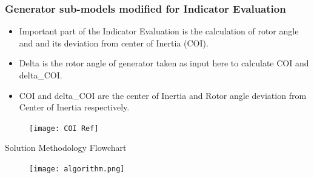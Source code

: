 \documentclass [xcolor=svgnames, t] {beamer}
\begin{document}
	\begin{frame}
	\frametitle{Generator sub-models modified for Indicator Evaluation}
	\begin{itemize} \justifying 
	\item Important part of the Indicator Evaluation is the calculation of rotor angle and and its deviation from center of Inertia (COI).
\item Delta is the rotor angle of generator taken as input here to calculate COI and delta\_COI.
\item COI and delta\_COI are the center of Inertia and Rotor angle deviation from Center of Inertia respectively.

	\end{itemize}
	\begin{figure}
	\texttt{[image: COI Ref]}
	\end{figure}
	\end{frame} 
	
	\begin{frame}{Solution Methodology Flowchart}
\begin{figure}[H]
	 \centering
	\texttt{[image: algorithm.png]}
	
\end{figure}
\end{frame}
\end{document}

